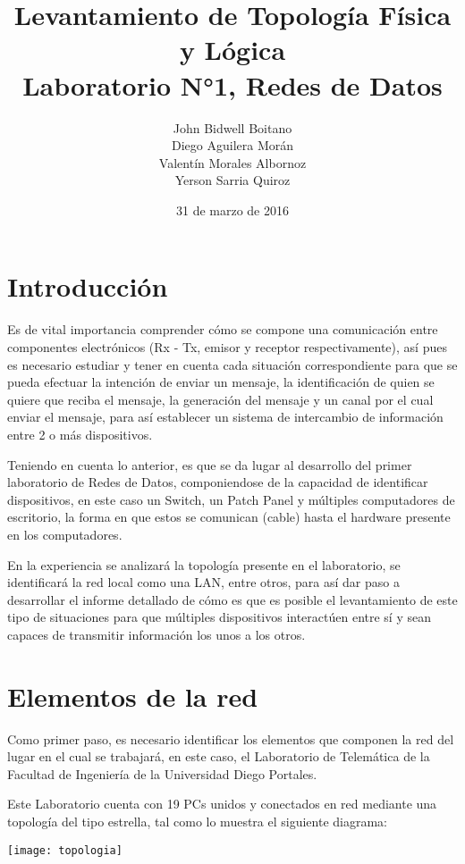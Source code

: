 \documentclass[spanish]{udpreport}
\title{
	Levantamiento de Topología Física y Lógica\\[2ex]
	\normalsize
	Laboratorio N°1, Redes de Datos
    }
\author{John Bidwell Boitano\\ Diego Aguilera Morán \\ Valentín Morales Albornoz \\ Yerson Sarria Quiroz}
\date{31 de marzo de 2016}
\begin{document}
\maketitle

\tableofcontents

\chapter{Introducción}
  Es de vital importancia comprender cómo se compone una comunicación entre componentes electrónicos (Rx - Tx, emisor y receptor respectivamente), así pues es necesario estudiar y tener en cuenta cada situación correspondiente para que se pueda efectuar la intención de enviar un mensaje, la identificación de quien se quiere que reciba el mensaje, la generación del mensaje y un canal por el cual enviar el mensaje, para así establecer un sistema de intercambio de información entre 2 o más dispositivos.


 Teniendo en cuenta lo anterior, es que se da lugar al desarrollo del primer laboratorio de Redes de Datos, componiendose de la capacidad de identificar dispositivos, en este caso un Switch, un Patch Panel y múltiples computadores de escritorio, la forma en que estos se comunican (cable) hasta el hardware presente en los computadores. 


 En la experiencia se analizará la topología presente en el laboratorio, se identificará la red local como una LAN, entre otros, para así dar paso a desarrollar el informe detallado de cómo es que es posible el levantamiento de este tipo de situaciones para que múltiples dispositivos interactúen entre sí y sean capaces de transmitir información los unos a los otros.



\chapter{ Elementos de la red }

Como primer paso, es necesario identificar los elementos que componen la red del lugar en el cual se trabajará, en este caso, el Laboratorio de Telemática de la Facultad de Ingeniería de la Universidad Diego Portales.
    
    Este Laboratorio cuenta con 19 PCs unidos y conectados en red mediante una topología del tipo estrella, tal como lo muestra el siguiente diagrama:
    
    \texttt{[image: topologia]}
\end{document}

